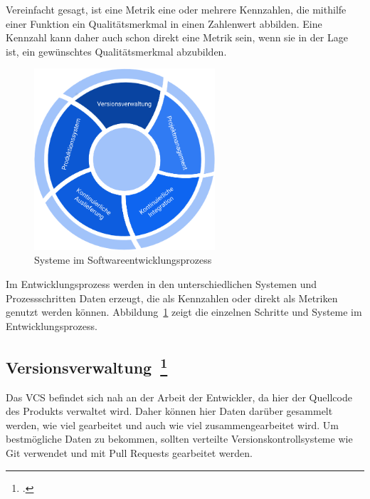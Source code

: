 Vereinfacht gesagt, ist eine Metrik eine oder mehrere Kennzahlen, die mithilfe einer Funktion ein Qualitätsmerkmal in einen Zahlenwert abbilden.
Eine Kennzahl kann daher auch schon direkt eine Metrik sein, wenn sie in der Lage ist, ein gewünschtes Qualitätsmerkmal abzubilden.

\begin{savenotes}
  \begin{figure}[H] 
    \centering
       \includegraphics[width=0.6\textwidth]{img/software-development-lifecycle.png}
    \caption[Systeme im Softwareentwicklungsprozess]{Systeme im Softwareentwicklungsprozess~\label{fig:sdlc}}
  \end{figure}
\end{savenotes}

Im Entwicklungsprozess werden in den unterschiedlichen Systemen und Prozessschritten Daten erzeugt, die als Kennzahlen oder direkt als Metriken genutzt werden können.
Abbildung~\ref{fig:sdlc} zeigt die einzelnen Schritte und Systeme im Entwicklungsprozess.

\clearpage
\subsection[Versionsverwaltung]{Versionsverwaltung~\footcite[vgl.][S.62ff]{davis_agile_2015}}

Das \ac{VCS} befindet sich nah an der Arbeit der Entwickler, da hier der Quellcode des Produkts verwaltet wird.
Daher können hier Daten darüber gesammelt werden, wie viel gearbeitet und auch wie viel zusammengearbeitet wird.
Um bestmögliche Daten zu bekommen, sollten verteilte Versionskontrollsysteme wie Git verwendet und mit Pull Requests gearbeitet werden.

